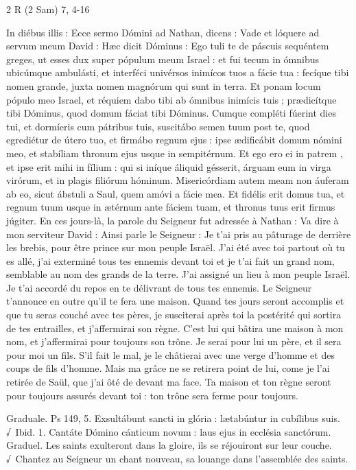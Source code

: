 \begin{paracol}{2}
2 R (2 Sam) 7, 4-16
\switchcolumn

\switchcolumn*

In diébus illis : Ecce sermo Dómini  ad Nathan, dicens : Vade et lóquere ad servum meum David : Hæc dicit Dóminus : Ego tuli te de páscuis sequéntem greges, ut esses dux super pópulum meum Israel : et fui tecum in ómnibus ubicúmque ambulásti, et interféci univérsos inimícos tuos a fácie tua : fecíque tibi nomen grande, juxta nomen magnórum qui sunt in terra. Et ponam locum pópulo meo Israel, et réquiem dabo tibi ab ómnibus inimícis tuis ; prædicítque tibi Dóminus, quod domum fáciat tibi Dóminus. Cumque compléti fúerint dies tui, et dormíeris cum pátribus tuis, suscitábo semen tuum post te, quod egrediétur de útero tuo, et firmábo regnum ejus : ipse ædificábit domum nómini meo, et stabíliam thronum ejus usque in sempitérnum. Et ego ero ei in patrem , et ipse erit mihi in fílium : qui si iníque áliquid gésserit, árguam eum in virga virórum, et in plagis filiórum hóminum. Misericórdiam autem meam non áuferam ab eo, sicut ábstuli a Saul, quem amóvi a fácie mea. Et fidélis erit domus tua, et regnum tuum usque in ætérnum ante fáciem tuam, et thronus tuus erit firmus júgiter.
\switchcolumn
En ces jours-là, la parole du Seigneur fut  adressée à Nathan : Va dire à mon serviteur David : Ainsi parle le Seigneur : Je t’ai pris au pâturage de derrière les brebis, pour être prince sur mon peuple Israël. J’ai été avec toi partout où tu es allé, j’ai exterminé tous tes ennemis devant toi et je t’ai fait un grand nom, semblable au nom des grands de la terre. J’ai assigné un lieu à mon peuple Israël. Je t’ai accordé du repos en te délivrant de tous tes ennemis. Le Seigneur t’annonce en outre qu’il te fera une maison. Quand tes jours seront accomplis et que tu seras couché avec tes pères, je susciterai après toi la postérité qui sortira de tes entrailles, et j’affermirai son règne. C’est lui qui bâtira une maison à mon nom, et j’affermirai pour toujours son trône. Je serai pour lui un père, et il sera pour moi un fils. S’il fait le mal, je le châtierai avec une verge d’homme et des coups de fils d’homme. Mais ma grâce ne se retirera point de lui, come je l’ai retirée de Saül, que j’ai ôté de devant ma face. Ta maison et ton règne seront pour toujours assurés devant toi : ton trône sera ferme pour toujours.
\switchcolumn*

Graduale. Ps 149, 5. Exsultábunt sancti in glória : lætabúntur in cubílibus suis. √~Ibid. 1. Cantáte Dómino cánticum novum : laus ejus in ecclésia sanctórum.
\switchcolumn
Graduel. Les saints exulteront dans la gloire, ils se réjouiront sur leur couche. √~Chantez au Seigneur un chant nouveau, sa louange dans l’assemblée des saints.
\switchcolumn*


\end{paracol}

